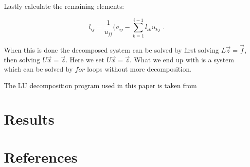 \documentclass[english,a4paper, 11pt]{article}
\begin{document}
Lastly calculate the remaining elements:

\begin{equation}
l_{ij} = \frac{1}{u_{jj}}(a_{ij} - \sum_{k=1}^{i-1}l_{ik}u_{kj}\;.
\label{LUl}
\end{equation}

When this is done the decomposed system can be solved by first solving $L\vec{z} = \vec{f}$, then solving $U\vec{x} = \vec{z}$. Here we set $U\vec{x} = \vec{z}$. What we end up with is a system which can be solved by $for$ loops without more decomposition.

The LU decomposition program used in this paper is taken from






\section{Results}

\section{References}
\end{document}
